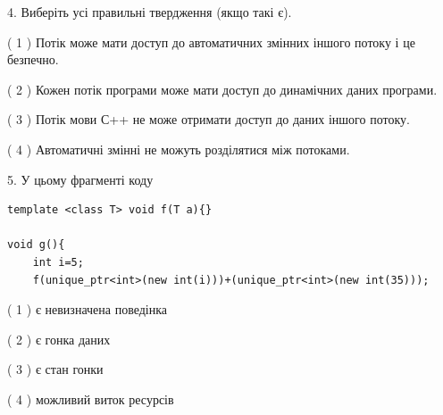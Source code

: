 \documentclass[12pt, ukrainian]{article}
\begin{document}
\begin {large}
{%
4. Виберіть усі правильні твердження (якщо такі є).\par
\vspace{2mm}

( 1 ) Потік може мати доступ до автоматичних змінних іншого потоку і це безпечно.%

( 2 ) Кожен потік програми може мати доступ до динамічних даних програми.%

( 3 ) Потік мови С++ не може отримати доступ до даних іншого потоку.%

( 4 ) Автоматичні змінні не можуть розділятися між потоками.%


5. У цьому фрагменті коду
\begin{verbatim}
template <class T> void f(T a){}

void g(){
    int i=5;
    f(unique_ptr<int>(new int(i)))+(unique_ptr<int>(new int(35)));
\end{verbatim}
( 1 ) є невизначена поведінка%

( 2 ) є гонка даних%

( 3 ) є стан гонки%

( 4 ) можливий виток ресурсів%
}
\end {large}
\end{document}

